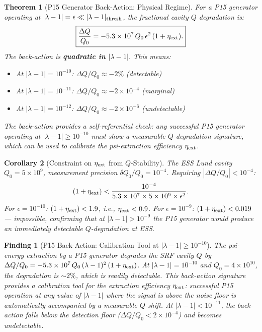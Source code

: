 \documentclass[11pt,twocolumn]{article}
\newcommand{\lam}{\lambda}
\newcommand{\ee}[1]{\times 10^{#1}}
\newtheorem{theorem}{Theorem}[section]
\newtheorem{corollary}[theorem]{Corollary}
\newtheorem{finding}{Finding}[section]
\begin{document}
\begin{theorem}[P15 Generator Back-Action: Physical Regime]
\label{thm:backaction_physical}
For a P15 generator operating at $|\lam-1| = \epsilon \ll |\lam-1|_{\rm thresh}$,
the fractional cavity $Q$ degradation is:
\begin{equation}
\boxed{
\frac{\Delta Q}{Q_0} = -5.3\ee{7}\,Q_0\,\epsilon^2\,(1 + \eta_{\rm ext}).
}
\label{eq:backaction_general}
\end{equation}
The back-action is \textbf{quadratic in $|\lam-1|$}. This means:
\begin{itemize}[nosep]
\item At $|\lam-1| = 10^{-10}$: $\Delta Q/Q_0 \approx -2\%$ (detectable)
\item At $|\lam-1| = 10^{-11}$: $\Delta Q/Q_0 \approx -2\ee{-4}$ (marginal)
\item At $|\lam-1| = 10^{-12}$: $\Delta Q/Q_0 \approx -2\ee{-6}$ (undetectable)
\end{itemize}
The back-action provides a self-referential check: any successful
P15 generator operating at $|\lam-1| \geq 10^{-10}$ must show a
measurable $Q$-degradation signature, which can be used to
\emph{calibrate the psi-extraction efficiency} $\eta_{\rm ext}$.
\end{theorem}

\begin{corollary}[Constraint on $\eta_{\rm ext}$ from $Q$-Stability]
\label{cor:eta_constraint}
The ESS Lund cavity $Q_0 = 5\ee{9}$, measurement precision
$\delta Q_0/Q_0 = 10^{-4}$. Requiring $|\Delta Q/Q_0| < 10^{-4}$:
\begin{equation}
(1+\eta_{\rm ext}) < \frac{10^{-4}}{5.3\ee{7}\times5\ee{9}\times\epsilon^2}.
\label{eq:eta_constraint}
\end{equation}
For $\epsilon = 10^{-10}$: $(1+\eta_{\rm ext}) < 1.9$, i.e., $\eta_{\rm ext} < 0.9$.
For $\epsilon = 10^{-9}$: $(1+\eta_{\rm ext}) < 0.019$ --- impossible,
confirming that at $|\lam-1| > 10^{-9}$ the P15 generator would
produce an immediately detectable $Q$-degradation at ESS.
\end{corollary}

\begin{finding}[P15 Back-Action: Calibration Tool at $|\lam-1| \geq 10^{-10}$]
\label{find:back_action}
The psi-energy extraction by a P15 generator degrades the SRF cavity $Q$
by $\Delta Q/Q_0 = -5.3\ee{7}\,Q_0\,(\lam-1)^2\,(1+\eta_{\rm ext})$.
At $|\lam-1| = 10^{-10}$ and $Q_0 = 4\ee{10}$, the degradation is $\sim 2\%$,
which is readily detectable. This back-action signature provides a
calibration tool for the extraction efficiency $\eta_{\rm ext}$: successful
P15 operation at any value of $|\lam-1|$ where the signal is above the
noise floor is automatically accompanied by a measurable $Q$-shift.
At $|\lam-1| < 10^{-11}$, the back-action falls below the detection floor
($\Delta Q/Q_0 < 2\ee{-4}$) and becomes undetectable.
\end{finding}
\end{document}
